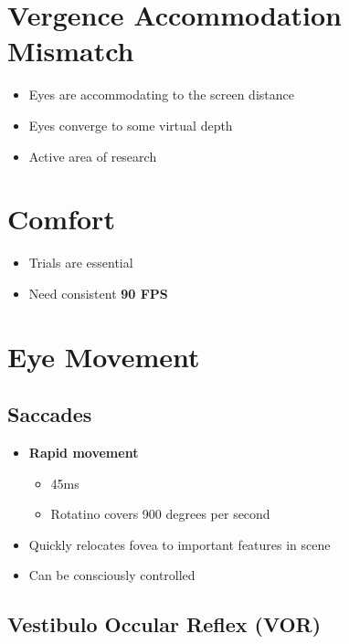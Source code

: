 \section{Vergence Accommodation Mismatch}

  \begin{itemize}
    \item Eyes are accommodating to the screen distance
    \item Eyes converge to some virtual depth
    \item Active area of research
  \end{itemize}

\section{Comfort}

  \begin{itemize}
    \item Trials are essential
    \item Need consistent \textbf{90 FPS}
  \end{itemize}

\section{Eye Movement}

  \subsection{Saccades}

    \begin{itemize}
      \item \textbf{Rapid movement}
      \begin{itemize}
        \item 45ms
        \item Rotatino covers 900 degrees per second
      \end{itemize}

      \item Quickly relocates fovea to important features in scene
      \item Can be consciously controlled
    \end{itemize}

  \subsection{Vestibulo Occular Reflex (VOR)}

